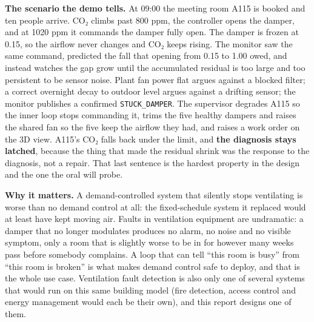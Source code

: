 \textbf{The scenario the demo tells.} At 09:00 the meeting room A115 is booked and ten people
arrive. CO₂ climbs past 800 ppm, the controller opens the damper, and at 1020 ppm it commands the
damper fully open. The damper is frozen at 0.15, so the airflow never changes and CO₂ keeps
rising. The monitor saw the same command, predicted the fall that opening from 0.15 to 1.00 owed,
and instead watches the gap grow until the accumulated residual is too large and too persistent to
be sensor noise. Plant fan power flat argues against a blocked filter; a correct overnight decay
to outdoor level argues against a drifting sensor; the monitor publishes a confirmed
\texttt{STUCK\_DAMPER}. The supervisor degrades A115 so the inner loop stops commanding it, trims
the five healthy dampers and raises the shared fan so the five keep the airflow they had, and
raises a work order on the 3D view. A115's CO₂ falls back under the limit, and \textbf{the
diagnosis stays latched}, because the thing that made the residual shrink was the response to the
diagnosis, not a repair. That last sentence is the hardest property in the design and the one the
oral will probe.

\textbf{Why it matters.} A demand-controlled system that silently stops ventilating is worse than no
demand control at all: the fixed-schedule system it replaced would at least have kept moving air.
Faults in ventilation equipment are undramatic: a damper that no longer modulates produces no
alarm, no noise and no visible symptom, only a room that is slightly worse to be in for however many
weeks pass before somebody complains. A loop that can tell ``this room is busy'' from ``this room is
broken'' is what makes demand control safe to deploy, and that is the whole use case. Ventilation
fault detection is also only one of several systems that would run on this same building model
(fire detection, access control and energy management would each be their own), and this report
designs one of them.
